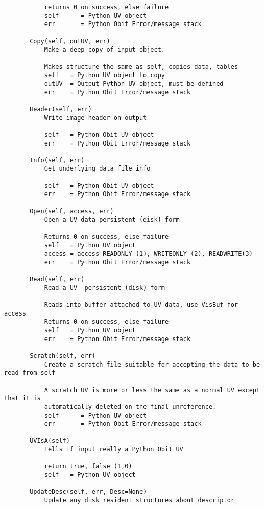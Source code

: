 \documentclass[11pt]{report}
\begin{document}
\begin{verbatim}
           returns 0 on success, else failure
           self      = Python UV object
           err       = Python Obit Error/message stack
       
       Copy(self, outUV, err)
           Make a deep copy of input object.
           
           Makes structure the same as self, copies data, tables
           self   = Python UV object to copy
           outUV  = Output Python UV object, must be defined
           err    = Python Obit Error/message stack
       
       Header(self, err)
           Write image header on output
           
           self   = Python Obit UV object
           err    = Python Obit Error/message stack
       
       Info(self, err)
           Get underlying data file info
           
           self   = Python Obit UV object
           err    = Python Obit Error/message stack
       
       Open(self, access, err)
           Open a UV data persistent (disk) form
           
           Returns 0 on success, else failure
           self   = Python UV object
           access = access READONLY (1), WRITEONLY (2), READWRITE(3)
           err    = Python Obit Error/message stack
       
       Read(self, err)
           Read a UV  persistent (disk) form
           
           Reads into buffer attached to UV data, use VisBuf for access
           Returns 0 on success, else failure
           self   = Python UV object
           err    = Python Obit Error/message stack
       
       Scratch(self, err)
           Create a scratch file suitable for accepting the data to be read from self
           
           A scratch UV is more or less the same as a normal UV except that it is
           automatically deleted on the final unreference.
           self      = Python UV object
           err       = Python Obit Error/message stack
       
       UVIsA(self)
           Tells if input really a Python Obit UV
           
           return true, false (1,0)
           self   = Python UV object
       
       UpdateDesc(self, err, Desc=None)
           Update any disk resident structures about descriptor
           

\end{verbatim}
\end{document}
